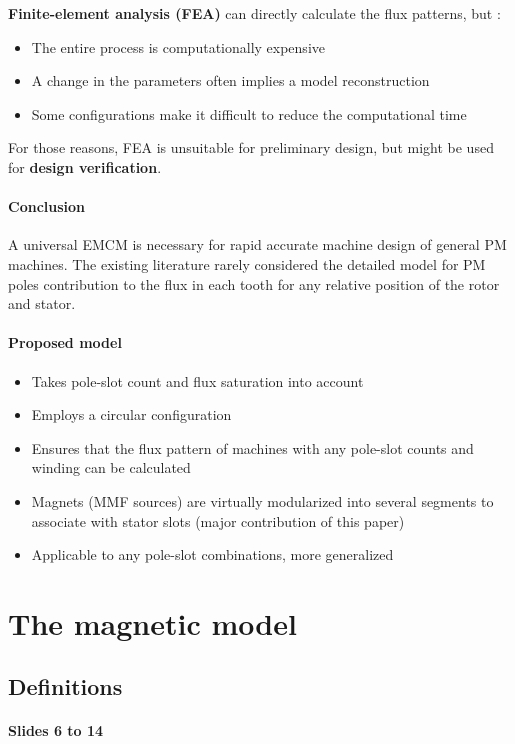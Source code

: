 \textbf{Finite-element analysis (FEA)} can directly calculate the flux patterns, but :
\begin{itemize}
    \item The entire process is computationally expensive
    \item A change in the parameters often implies a model reconstruction
    \item Some configurations make it difficult to reduce the computational time
\end{itemize}
For those reasons, FEA is unsuitable for preliminary design, but might be used for \textbf{design verification}. 

\paragraph{Conclusion} A universal EMCM is necessary for rapid accurate machine design of general PM machines. The existing literature rarely considered the detailed model for PM poles contribution to the flux in each tooth for any relative position of the rotor and stator.

\paragraph{Proposed model}
\begin{itemize}
    \item Takes pole-slot count and flux saturation into account
    \item Employs a circular configuration
    \item Ensures that the flux pattern of machines with any pole-slot counts and winding can be calculated
    \item Magnets (MMF sources) are virtually modularized into several segments to associate with stator slots (major contribution of this paper)
    \item Applicable to any pole-slot combinations, more generalized
\end{itemize}

\section{The magnetic model}
\subsection{Definitions}
\paragraph{Slides 6 to 14}


